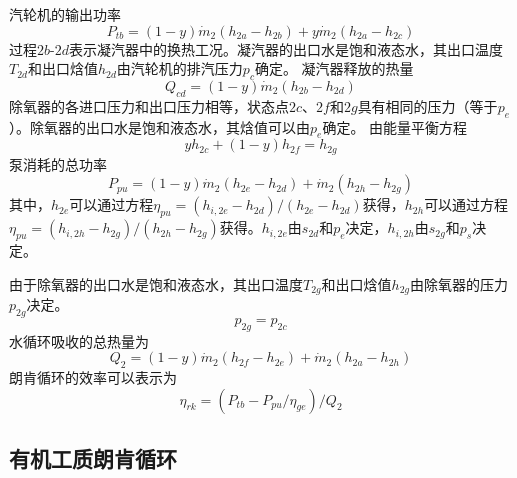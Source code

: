   汽轮机的输出功率
  \begin{equation}
  P_{tb}=\left(1-y\right)\dot{m}_{2}\left(h_{2a}-h_{2b}\right)+y\dot{m}_{2}\left(h_{2a}-h_{2c}\right)
  \end{equation}
  过程$2b$-$2d$表示凝汽器中的换热工况。凝汽器的出口水是饱和液态水，其出口温度$T_{2d}$和出口焓值$h_{2d}$由汽轮机的排汽压力$p_c$确定。
  凝汽器释放的热量
  \begin{equation}
      Q_{cd} = (1-y)\dot{m}_2 (h_{2b} - h_{2d})
\end{equation}
  除氧器的各进口压力和出口压力相等，状态点$2c$、$2f$和$2g$具有相同的压力（等于$p_e$）。除氧器的出口水是饱和液态水，其焓值可以由$p_e$确定。
  由能量平衡方程
  \begin{equation}
  y h_{2c} + (1-y) h_{2f} = h_{2g}
\end{equation}
  泵消耗的总功率
\begin{equation}
	P_{pu}=\left(1-y\right)\dot{m}_{2}\left(h_{2e}-h_{2d}\right)+\dot{m}_{2}\left(h_{2h}-h_{2g}\right)
\end{equation}
其中，$h_{2e}$可以通过方程$\eta_{pu} = (h_{i,2e}-h_{2d})/(h_{2e}-h_{2d})$获得，$h_{2h}$可以通过方程$\eta_{pu} = (h_{i,2h}-h_{2g})/(h_{2h}-h_{2g})$获得。$h_{i,2e}$由$s_{2d}$和$p_e$决定，$h_{i,2h}$由$s_{2g}$和$p_s$决定。

由于除氧器的出口水是饱和液态水，其出口温度$T_{2g}$和出口焓值$h_{2g}$由除氧器的压力$p_{2g}$决定。
\begin{equation}
  p_{2g} = p_{2c}
\end{equation}    
水循环吸收的总热量为
\begin{equation}
	Q_2=\left(1-y\right)\dot{m}_{2}\left(h_{2f}-h_{2e}\right)+\dot{m}_{2}\left(h_{2a}-h_{2h}\right)
\end{equation}
朗肯循环的效率可以表示为
\begin{equation}
	\eta_{rk}=(P_{tb}-P_{pu}/\eta_{ge})/Q_{2}
\end{equation}

\subsection{有机工质朗肯循环}
  
